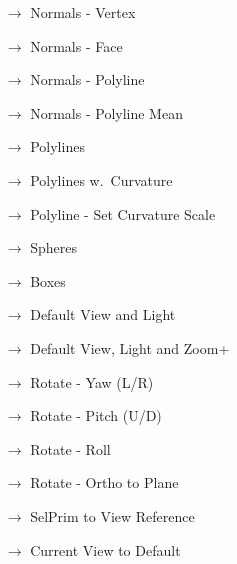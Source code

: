 {\begin{itemize}
\begin{itemize}
 \item[$\rightarrow$] Normals - Vertex
 \item[$\rightarrow$] Normals - Face
 \color{gray}
 \item[$\rightarrow$] Normals - Polyline
 \item[$\rightarrow$] Normals - Polyline Mean
 \item[$\rightarrow$] Polylines
 \item[$\rightarrow$] Polylines w.~Curvature
 \item[$\rightarrow$] Polyline - Set Curvature Scale
 \color{black}
 \item[$\rightarrow$] Spheres
 \item[$\rightarrow$] Boxes
 \item[$\rightarrow$] Default View and Light\qquad\qquad{}
 \item[$\rightarrow$] Default View, Light and Zoom\quad {}+
 \item[$\rightarrow$] Rotate - Yaw (L/R)
 \item[$\rightarrow$] Rotate - Pitch (U/D)
 \item[$\rightarrow$] Rotate - Roll
 \item[$\rightarrow$] Rotate - Ortho to Plane\qquad {}
 \item[$\rightarrow$] SelPrim to View Reference\quad {}
 \item[$\rightarrow$] Current View to Default\qquad {}
  \end{itemize}
 \end{itemize}
 }
 
 
